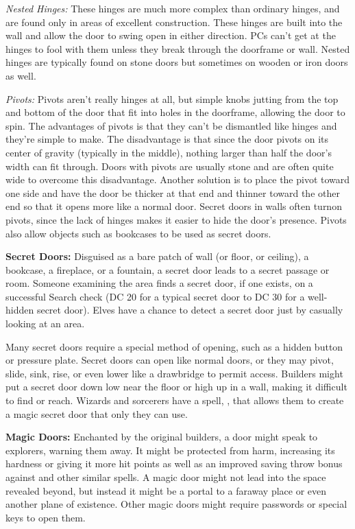 \textit{Nested Hinges:} These hinges are much more complex than ordinary hinges, and are found only in areas of excellent construction. These hinges are built into the wall and allow the door to swing open in either direction. PCs can't get at the hinges to fool with them unless they break through the doorframe or wall. Nested hinges are typically found on stone doors but sometimes on wooden or iron doors as well. 

\textit{Pivots:} Pivots aren't really hinges at all, but simple knobs jutting from the top and bottom of the door that fit into holes in the doorframe, allowing the door to spin. The advantages of pivots is that they can't be dismantled like hinges and they're simple to make. The disadvantage is that since the door pivots on its center of gravity (typically in the middle), nothing larger than half the door's width can fit through. Doors with pivots are usually stone and are often quite wide to overcome this disadvantage. Another solution is to place the pivot toward one side and have the door be thicker at that end and thinner toward the other end so that it opens more like a normal door. Secret doors in walls often turnon pivots, since the lack of hinges makes it easier to hide the door's presence. Pivots also allow objects such as bookcases to be used as secret doors.

\textbf{Secret Doors:} Disguised as a bare patch of wall (or floor, or ceiling), a bookcase, a fireplace, or a fountain, a secret door leads to a secret passage or room. Someone examining the area finds a secret door, if one exists, on a successful Search check (DC 20 for a typical secret door to DC 30 for a well-hidden secret door). Elves have a chance to detect a secret door just by casually looking at an area.

Many secret doors require a special method of opening, such as a hidden button or pressure plate. Secret doors can open like normal doors, or they may pivot, slide, sink, rise, or even lower like a drawbridge to permit access. Builders might put a secret door down low near the floor or high up in a wall, making it difficult to find or reach. Wizards and sorcerers have a spell, , that allows them to create a magic secret door that only they can use.

\textbf{Magic Doors:} Enchanted by the original builders, a door might speak to explorers, warning them away. It might be protected from harm, increasing its hardness or giving it more hit points as well as an improved saving throw bonus against  and other similar spells. A magic door might not lead into the space revealed beyond, but instead it might be a portal to a faraway place or even another plane of existence. Other magic doors might require passwords or special keys to open them. 

